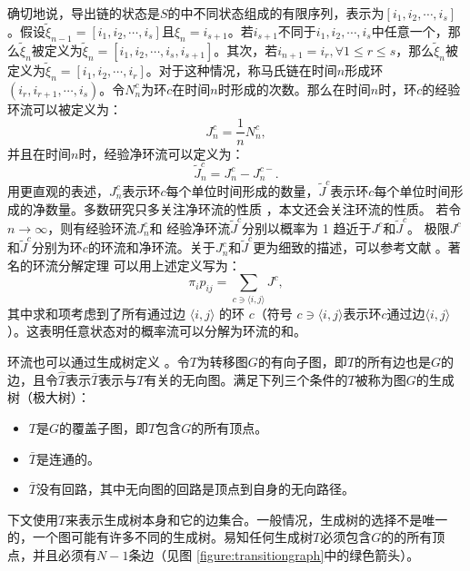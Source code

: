 确切地说，导出链的状态是$S$的中不同状态组成的有限序列，表示为$[i_1,i_2,\cdots,i_s]$。假设$\tilde{\xi}_{n-1}=[i_1,i_2,\cdots,i_s]$且$\xi_n = i_{s+1}$。若$i_{s+1}$不同于$i_1,i_2,\cdots,i_s$中任意一个，那么$\tilde{\xi}_n$被定义为$\tilde{\xi}_n = [i_1,i_2,\cdots,i_s,i_{s+1}]$。其次，若$i_{n+1}=i_r, \forall 1 \le r\le s$，那么$\tilde{\xi}_n$被定义为$\tilde{\xi}_n = [i_1,i_2,\cdots,i_r]$。对于这种情况，称马氏链在时间$n$形成环$(i_r,i_{r+1},\cdots,i_s)$。令$N^c_n$为环$c$在时间$n$时形成的次数。那么在时间$n$时，环$c$的经验环流可以被定义为：
\begin{equation*}
    J_n^c = \frac{1}{n}N^c_n,
\end{equation*}
并且在时间$n$时，经验净环流可以定义为：
\begin{equation*}
    \tilde{J}^c_n = J^c_n-J^{c-}_n.
\end{equation*}
用更直观的表述，$J^c_n$表示环$c$每个单位时间形成的数量，$\tilde{J}^c$表示环$c$每个单位时间形成的净数量。多数研究只多关注净环流的性质 \cite{Schnakenberg1976NetworkTO,andrieux2007fluctuation,andrieux2007network}，本文还会关注环流的性质。
若令$n\rightarrow\infty$，则有经验环流$J^c_n$和 经验净环流$\tilde{J}^c$分别以概率为 1 趋近于$J^c$和$\tilde{J}^c$。
极限$J^c$和$\tilde{J}^c$分别为环$c$的环流和净环流。关于$J^c_n$和$\tilde{J}^c$更为细致的描述，可以参考文献 \cite{jiang2004mathematical}。著名的环流分解定理 \cite{jiang2004mathematical} 可以用上述定义写为：
\begin{equation}\label{decomposition}
    \pi_ip_{ij} = \sum_{c\ni\langle i,j\rangle}J^c,
\end{equation}
其中求和项考虑到了所有通过边 $\langle i, j\rangle$ 的环 $c$（符号 $c \ni \langle i, j\rangle$表示环$c$通过边$\langle i, j\rangle$）。这表明任意状态对的概率流可以分解为环流的和。

环流也可以通过生成树定义 \cite{Schnakenberg1976NetworkTO,kalpazidou2007cycle}。令$T$为转移图$G$的有向子图，即$T$的所有边也是$G$的边，且令$\hat{T}$表示$\bar{T}$表示与$T$有关的无向图。满足下列三个条件的$T$被称为图$G$的生成树（极大树）：
\begin{itemize}
    \item $T$是$G$的覆盖子图，即$T$包含$G$的所有顶点。
    \item $\bar{T}$是连通的。
    \item $\bar{T}$没有回路，其中无向图的回路是顶点到自身的无向路径。
\end{itemize}

下文使用$T$来表示生成树本身和它的边集合。一般情况，生成树的选择不是唯一的，一个图可能有许多不同的生成树。易知任何生成树$T$必须包含$G$的的所有顶点，并且必须有$N-1$条边（见图 \ref{figure:transitiongraph}中的绿色箭头）\cite{kalpazidou2007cycle}。

